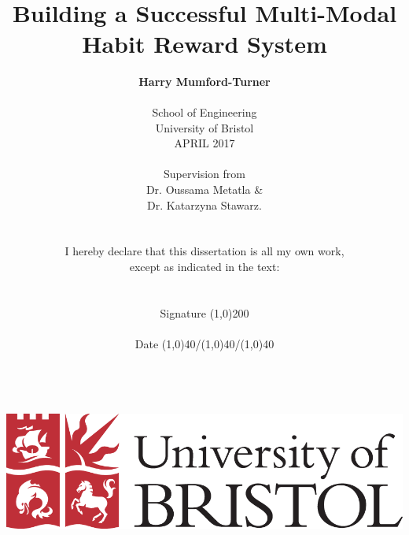 
\date{} %
\title{\huge{\textbf{\\\\\\Building a Successful Multi-Modal Habit Reward System}}}
\author{\textbf{Harry Mumford-Turner}\\
\\
School of Engineering\\
University of Bristol\\
APRIL 2017\\
\\
Supervision from\\
Dr. Oussama Metatla \&\\Dr. Katarzyna Stawarz.
\\
\\\\
I hereby declare that this dissertation is all my own work,\\
except as indicated in the text:\\
\\
\\
Signature \line(1,0){200}\\
\\
Date \line(1,0){40}/\line(1,0){40}/\line(1,0){40}\\
\\
\\
\\
\\
\includegraphics[scale=0.29]{resources/UoB-logo.png}}
